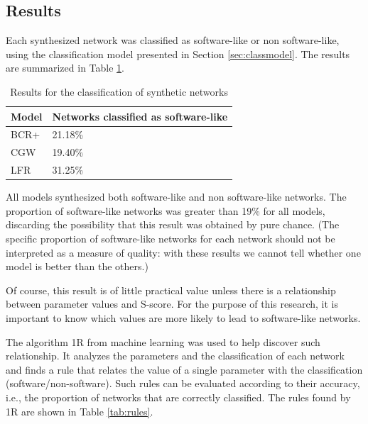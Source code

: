 \subsection{Results}

Each synthesized network was classified as software-like or non software-like,
using the classification model presented in Section \ref{sec:classmodel}. The
results are summarized in Table \ref{tab:results}. 

\begin{table}
\caption{Results for the classification of synthetic networks}
\centering
\begin{tabular}{|l|l|}
\hline
Model & Networks classified as software-like \\
\hline 
\hline
BCR+ & 21.18\% \\ %
\hline
CGW  & 19.40\% \\  %
\hline
LFR  & 31.25\% \\ %
\hline
\end{tabular}
\label{tab:results}
\end{table}

All models synthesized both software-like and non software-like networks. The
proportion of software-like networks was greater than 19\% for all models,
discarding the possibility that this result was obtained by pure chance. (The
specific proportion of software-like networks for each network should not be
interpreted as a measure of quality: with these results we cannot tell whether
one model is better than the others.)

Of course, this result is of little practical value unless there is a
relationship between parameter values and S-score. For the purpose of this
research, it is important to know which values are more likely to lead to
software-like networks.

The algorithm 1R \cite{OneR} from machine learning was used to help discover
such relationship. It analyzes the parameters and the classification of each
network and finds a rule that relates the value of a single parameter with the
classification (software/non-software). Such rules can be evaluated according
to their accuracy, i.e., the proportion of networks that are correctly
classified. The rules found by 1R are shown in Table \ref{tab:rules}.

